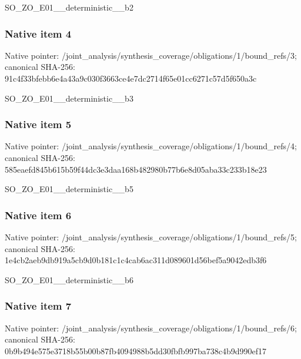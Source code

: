 \documentclass[10pt,a4paper]{article}
\begin{document}
\begingroup\raggedright\sloppy SO\_\allowbreak{}ZO\_\allowbreak{}E01\_\allowbreak{}\_\allowbreak{}deterministic\_\allowbreak{}\_\allowbreak{}b2\par\endgroup

\subsubsection{Native item 4}
Native pointer: /joint\_\allowbreak{}analysis/synthesis\_\allowbreak{}coverage/obligations/1/bound\_\allowbreak{}refs/3; canonical SHA-256: 91c4f33bfebb6e4a43a9c030f3663ce4e7dc2714f65e01cc6271c57d5f650a3c

\begingroup\raggedright\sloppy SO\_\allowbreak{}ZO\_\allowbreak{}E01\_\allowbreak{}\_\allowbreak{}deterministic\_\allowbreak{}\_\allowbreak{}b3\par\endgroup

\subsubsection{Native item 5}
Native pointer: /joint\_\allowbreak{}analysis/synthesis\_\allowbreak{}coverage/obligations/1/bound\_\allowbreak{}refs/4; canonical SHA-256: 585eaefd845b615b59f44dc3e3daa168b482980b77b6e8d05aba33c233b18e23

\begingroup\raggedright\sloppy SO\_\allowbreak{}ZO\_\allowbreak{}E01\_\allowbreak{}\_\allowbreak{}deterministic\_\allowbreak{}\_\allowbreak{}b5\par\endgroup

\subsubsection{Native item 6}
Native pointer: /joint\_\allowbreak{}analysis/synthesis\_\allowbreak{}coverage/obligations/1/bound\_\allowbreak{}refs/5; canonical SHA-256: 1e4cb2aeb9db919a5cb9d0b181c1c4cab6ac311d089601d56bef5a9042edb3f6

\begingroup\raggedright\sloppy SO\_\allowbreak{}ZO\_\allowbreak{}E01\_\allowbreak{}\_\allowbreak{}deterministic\_\allowbreak{}\_\allowbreak{}b6\par\endgroup

\subsubsection{Native item 7}
Native pointer: /joint\_\allowbreak{}analysis/synthesis\_\allowbreak{}coverage/obligations/1/bound\_\allowbreak{}refs/6; canonical SHA-256: 0b9b494e575e3718b55b00b87fb4094988b5dd30fbfb997ba738c4b9d990ef17
\end{document}

